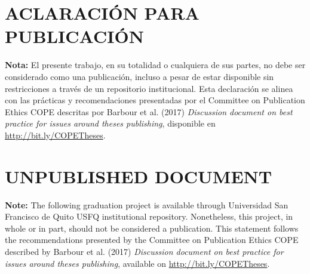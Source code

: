 \section*{ACLARACIÓN PARA PUBLICACIÓN}

\textbf{Nota:} El presente trabajo, en su totalidad o cualquiera de sus partes, no debe ser considerado como una publicación, incluso a pesar de estar disponible sin restricciones a través de un repositorio institucional. Esta declaración se alinea con las prácticas y recomendaciones presentadas por el Committee on Publication Ethics COPE descritas por Barbour et al. (2017) \textit{Discussion document on best practice for issues around theses publishing}, disponible en \url{http://bit.ly/COPETheses}.

\vspace{1.2cm}

\section*{UNPUBLISHED DOCUMENT}

\textbf{Note:} The following graduation project is available through Universidad San Francisco de Quito USFQ institutional repository. Nonetheless, this project, in whole or in part, should not be considered a publication. This statement follows the recommendations presented by the Committee on Publication Ethics COPE described by Barbour et al. (2017) \textit{Discussion document on best practice for issues around theses publishing}, available on \url{http://bit.ly/COPETheses}.
